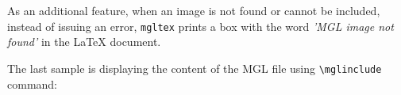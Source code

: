 \documentclass[12pt]{article}
\begin{document}
As an additional feature, when an image is not found or cannot be included, instead of issuing an error, \texttt{mgltex} prints a box with the word \emph{'MGL image not found'} in the LaTeX document.
\begin{figure}[!ht]
  \centering
\end{figure}

The last sample is displaying the content of the MGL file using \texttt{\textbackslash{}mglinclude} command:
\end{document}
